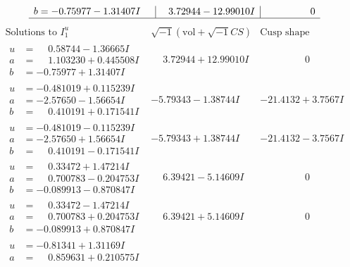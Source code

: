 \documentclass[1p]{elsarticle_modified}
\theoremstyle{definition}
\newcommand{\I}{\sqrt{-1}}
\begin{document}
$$\begin{array}{c|c|c}
\begin{aligned}
b &= -0.75977 - 1.31407 I\end{aligned}
 & \phantom{-}3.72944 - 12.99010 I & \phantom{-0.000000 } 0\\
 \hline 
 \end{array}$$\newpage$$\begin{array}{c|c|c}  
\text{Solutions to }I^u_{1}& \I (\text{vol} + \sqrt{-1}CS) & \text{Cusp shape}\\
 \hline 
\begin{aligned}
u &= \phantom{-}0.58744 - 1.36665 I \\
a &= \phantom{-}1.103230 + 0.445508 I \\
b &= -0.75977 + 1.31407 I\end{aligned}
 & \phantom{-}3.72944 + 12.99010 I & \phantom{-0.000000 } 0 \\ \hline\begin{aligned}
u &= -0.481019 + 0.115239 I \\
a &= -2.57650 - 1.56654 I \\
b &= \phantom{-}0.410191 + 0.171541 I\end{aligned}
 & -5.79343 - 1.38744 I & -21.4132 + 3.7567 I \\ \hline\begin{aligned}
u &= -0.481019 - 0.115239 I \\
a &= -2.57650 + 1.56654 I \\
b &= \phantom{-}0.410191 - 0.171541 I\end{aligned}
 & -5.79343 + 1.38744 I & -21.4132 - 3.7567 I \\ \hline\begin{aligned}
u &= \phantom{-}0.33472 + 1.47214 I \\
a &= \phantom{-}0.700783 - 0.204753 I \\
b &= -0.089913 - 0.870847 I\end{aligned}
 & \phantom{-}6.39421 - 5.14609 I & \phantom{-0.000000 } 0 \\ \hline\begin{aligned}
u &= \phantom{-}0.33472 - 1.47214 I \\
a &= \phantom{-}0.700783 + 0.204753 I \\
b &= -0.089913 + 0.870847 I\end{aligned}
 & \phantom{-}6.39421 + 5.14609 I & \phantom{-0.000000 } 0 \\ \hline\begin{aligned}
u &= -0.81341 + 1.31169 I \\
a &= \phantom{-}0.859631 + 0.210575 I \\

\end{aligned}
\end{array}$$
\end{document}

